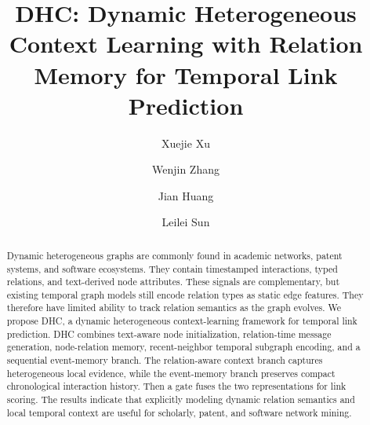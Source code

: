 
\title{DHC: Dynamic Heterogeneous Context Learning with Relation Memory for Temporal Link Prediction}

\author{Xuejie Xu 
\and Wenjin Zhang  
\and {}
\and Jian Huang 
\and Leilei Sun}
\maketitle

\begin{abstract}
Dynamic heterogeneous graphs are commonly found in academic networks, patent systems, and software ecosystems. 
They contain timestamped interactions, typed relations, and text-derived node attributes. 
These signals are complementary, but existing temporal graph models still encode relation types as static edge features. They therefore have limited ability to track relation semantics as the graph evolves. 
We propose DHC, a dynamic heterogeneous context-learning framework for temporal link prediction. 
DHC combines text-aware node initialization, relation-time message generation, node-relation memory, recent-neighbor temporal subgraph encoding, and a sequential event-memory branch.
The relation-aware context branch captures heterogeneous local evidence, while the event-memory branch preserves compact chronological interaction history. 
Then a gate fuses the two representations for link scoring. 
The results indicate that explicitly modeling dynamic relation semantics and local temporal context are useful for scholarly, patent, and software network mining.

\end{abstract}
